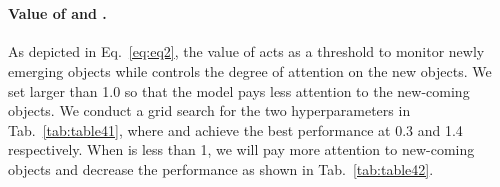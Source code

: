 \documentclass[10pt,twocolumn,letterpaper]{article}
\begin{document}
\begin{table}[t]
\vspace{-.2em}
\centering
{}
\centering
\hspace{0.5em}
\\
\centering
\caption{Grid search of  and  in Eq.~\ref{eq:eq2} for TAL.}
\label{tab:table4}
\end{table}


\paragraph{Value of  and .} As depicted in Eq.~\ref{eq:eq2}, the value of  acts as a threshold to monitor newly emerging objects while  controls the degree of attention on the new objects. We set  larger than 1.0 so that the model pays less attention to the new-coming objects. We conduct a grid search for the two hyperparameters in Tab.~\ref{tab:table41}, where  and  achieve the best performance at 0.3 and 1.4 respectively. When  is less than 1, we will pay more attention to new-coming objects and decrease the performance as shown in Tab.~\ref{tab:table42}.
\end{document}
